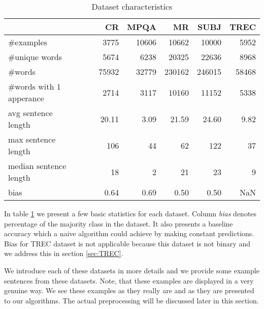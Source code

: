     \begin{table}[h]
    \begin{center}
    
    \begin{tabular}{l|rrrrr}
    \toprule
    {} &        CR &      MPQA &         MR &      SUBJ &      TREC \\\hline
    \midrule
    \#examples                                &   3775 &  10606 &   10662 &   10000 &   5952 \\\hline
    \#unique words                            &   5674 &   6238 &   20325 &   22636 &   8968 \\\hline
    \#words                                   &  75932 &  32779 &  230162 &  246015 &  58468 \\\hline
    \specialcell{\#words with\\$1$ apperance} &   2714 &   3117 &   10160 &   11152 &   5338 \\\hline
    \specialcell{avg sentence\\length}       &     20.11 &      3.09 &      21.59 &      24.60 &      9.82 \\\hline
    \specialcell{max sentence\\length}       &    106 &     44 &      62 &     122 &     37 \\\hline
    \specialcell{median sentence\\length}    &     18 &      2 &      21 &      23 &      9 \\\hline
    bias                                     &      0.64 &      0.69 &       0.50 &       0.50 &       NaN \\
    \bottomrule
    \end{tabular}
    
    \caption[Dataset characteristics]{Dataset characteristics}
    \label{tab:datasets:stats}
    \end{center}
    \end{table}


    In table \ref{tab:datasets:stats} we present a few basic statistics for each dataset.
    Column \emph{bias} denotes percentage of the majority class in the dataset.
    It also presents a baseline accuracy which a naive algorithm could achieve by making constant predictions. 
    Bias for TREC dataset is not applicable because this dataset is not binary and we address this in section \ref{sec:TREC}.
    
    We introduce each of these datasets in more details and we provide some example sentences from these datasets.
    Note, that these examples are displayed in a very genuine way. 
    We see these examples as they really are and as they are presented to our algorithms.
    The actual preprocessing will be discussed later in this section.
    
